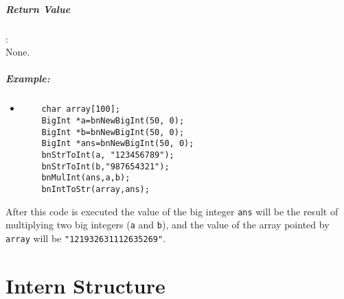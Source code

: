 \documentclass{book}
\begin{document}
\paragraph{Return Value}:\\

None.

\paragraph{Example:}

\begin{itemize}
\item
\begin{verbatim}
    char array[100];
    BigInt *a=bnNewBigInt(50, 0);
    BigInt *b=bnNewBigInt(50, 0);
    BigInt *ans=bnNewBigInt(50, 0);
    bnStrToInt(a, "123456789");
    bnStrToInt(b,"987654321");
    bnMulInt(ans,a,b);
    bnIntToStr(array,ans);
\end{verbatim}
\end{itemize}

After this code is executed the value of the big integer \verb+ans+ will be the result of multiplying two big integers (\verb+a+ and \verb+b+), and the value of the array pointed by \verb+array+ will be \verb+"121932631112635269"+.


\chapter{Intern Structure}
\end{document}
